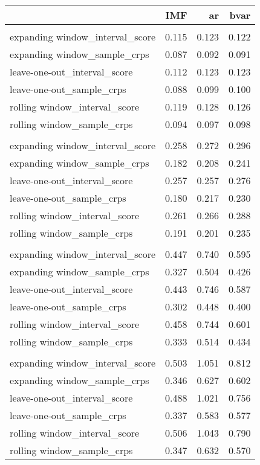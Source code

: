 \documentclass[
]{article}
\begin{document}
\newpage
\begin{longtable}{l|rrr}
\toprule
\multicolumn{1}{l}{} & IMF & ar & bvar \\ 
\midrule\addlinespace[2.5pt]
\multicolumn{4}{l}{horizon = 0} \\ 
\midrule\addlinespace[2.5pt]
expanding window\_interval\_score & 0.115 & 0.123 & 0.122 \\ 
expanding window\_sample\_crps & 0.087 & 0.092 & 0.091 \\ 
leave-one-out\_interval\_score & 0.112 & 0.123 & 0.123 \\ 
leave-one-out\_sample\_crps & 0.088 & 0.099 & 0.100 \\ 
rolling window\_interval\_score & 0.119 & 0.128 & 0.126 \\ 
rolling window\_sample\_crps & 0.094 & 0.097 & 0.098 \\ 
\midrule\addlinespace[2.5pt]
\multicolumn{4}{l}{horizon = 0.5} \\ 
\midrule\addlinespace[2.5pt]
expanding window\_interval\_score & 0.258 & 0.272 & 0.296 \\ 
expanding window\_sample\_crps & 0.182 & 0.208 & 0.241 \\ 
leave-one-out\_interval\_score & 0.257 & 0.257 & 0.276 \\ 
leave-one-out\_sample\_crps & 0.180 & 0.217 & 0.230 \\ 
rolling window\_interval\_score & 0.261 & 0.266 & 0.288 \\ 
rolling window\_sample\_crps & 0.191 & 0.201 & 0.235 \\ 
\midrule\addlinespace[2.5pt]
\multicolumn{4}{l}{horizon = 1} \\ 
\midrule\addlinespace[2.5pt]
expanding window\_interval\_score & 0.447 & 0.740 & 0.595 \\ 
expanding window\_sample\_crps & 0.327 & 0.504 & 0.426 \\ 
leave-one-out\_interval\_score & 0.443 & 0.746 & 0.587 \\ 
leave-one-out\_sample\_crps & 0.302 & 0.448 & 0.400 \\ 
rolling window\_interval\_score & 0.458 & 0.744 & 0.601 \\ 
rolling window\_sample\_crps & 0.333 & 0.514 & 0.434 \\ 
\midrule\addlinespace[2.5pt]
\multicolumn{4}{l}{horizon = 1.5} \\ 
\midrule\addlinespace[2.5pt]
expanding window\_interval\_score & 0.503 & 1.051 & 0.812 \\ 
expanding window\_sample\_crps & 0.346 & 0.627 & 0.602 \\ 
leave-one-out\_interval\_score & 0.488 & 1.021 & 0.756 \\ 
leave-one-out\_sample\_crps & 0.337 & 0.583 & 0.577 \\ 
rolling window\_interval\_score & 0.506 & 1.043 & 0.790 \\ 
rolling window\_sample\_crps & 0.347 & 0.632 & 0.570 \\ 
\bottomrule
\end{longtable}
\end{document}
